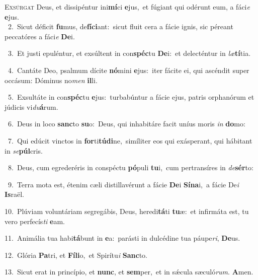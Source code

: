 \lettrine{\initial\textcolor{\initialcolor}{E}}{xsúrgat} Deus, et dissipéntur ini\-\textbf{mí}\-ci \textbf{e}\-jus,~\star et fúgiant qui odérunt eum, a fáci\textit{e} \textbf{e}\-jus.\\
{\numbfont\textcolor{\numbcolor}{~2.}}~Sicut déficit \textbf{fu}\-mus, de\-\textbf{fí}\-\textbf{ci}ant:~\star sicut fluit cera a fácie ignis, sic péreant peccatóres a fáci\textit{e} \textbf{De}\-i.\par
{\numbfont\textcolor{\numbcolor}{~3.}}~Et justi epuléntur, et exsúltent in con\-\textbf{spéc}\-tu \textbf{De}\-i:~\star et delecténtur in \textit{læ}\-\textbf{tí}tia.\par
{\numbfont\textcolor{\numbcolor}{~4.}}~Cantáte Deo, psalmum dícite \textbf{nó}\-mini \textbf{e}\-jus:~\star iter fácite ei, qui ascéndit super occásum: Dóminus no\textit{men} \textbf{il}\-li.\par
{\numbfont\textcolor{\numbcolor}{~5.}}~Exsultáte in con\-\textbf{spéc}\-tu \textbf{e}\-jus:~\star turbabúntur a fácie ejus, patris orphanórum et júdicis vi\-\textit{du}\-\textbf{á}rum.\par
{\numbfont\textcolor{\numbcolor}{~6.}}~Deus in loco \textbf{sanc}\-to \textbf{su}\-o:~\star Deus, qui inhabitáre facit uníus moris \textit{in} \textbf{do}\-mo:\par
{\numbfont\textcolor{\numbcolor}{~7.}}~Qui edúcit vinctos in \textbf{for}\-ti\-\textbf{tú}\-\textbf{di}ne,~\star simíliter eos qui exásperant, qui hábitant in \textit{se}\-\textbf{púl}cris.\par
{\numbfont\textcolor{\numbcolor}{~8.}}~Deus, cum egrederéris in conspéctu \textbf{pó}\-puli \textbf{tu}\-i,~\star cum pertransíres in \textit{de}\-\textbf{sér}to:\par
{\numbfont\textcolor{\numbcolor}{~9.}}~Terra mota est, étenim cæli distillavérunt a fácie \textbf{De}\-i \textbf{Sí}\-\textbf{na}i,~\star a fácie De\textit{i} \textbf{Is}\-raël.\par
{\numbfont\textcolor{\numbcolor}{10.}}~Plúviam voluntáriam segregábis, Deus, heredi\-\textbf{tá}\-ti \textbf{tu}\-æ:~\star et infirmáta est, tu vero perfecís\textit{ti} \textbf{e}\-am.\par
{\numbfont\textcolor{\numbcolor}{11.}}~Animália tua habi\-\textbf{tá}\-bunt in \textbf{e}\-a:~\star parásti in dulcédine tua páupe\-\textit{ri}\-, \textbf{De}\-us.\par
{\numbfont\textcolor{\numbcolor}{12.}}~Glória \textbf{Pa}\-tri, et \textbf{Fí}\-\textbf{li}o,~\star et Spirítu\textit{i} \textbf{Sanc}\-to.\par
{\numbfont\textcolor{\numbcolor}{13.}}~Sicut erat in princípio, et \textbf{nunc}\-, et \textbf{sem}\-per,~\star et in sǽcula sæculó\-\textit{rum}\-. \textbf{A}\-men.\par
